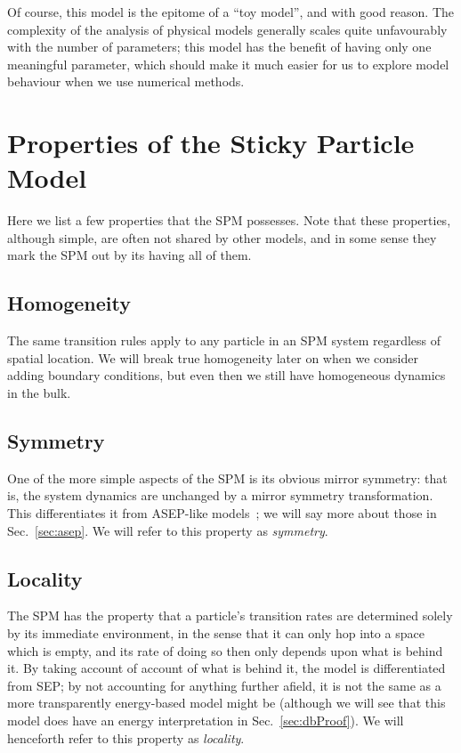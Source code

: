 Of course, this model is the epitome of a ``toy model'', and with good reason. The complexity of the
analysis of physical models generally scales quite unfavourably with the number of parameters; this model
has the benefit of having only one meaningful parameter, which should make it much easier for us
to explore model behaviour when we use numerical methods.

\section{Properties of the Sticky Particle Model} \label{sec:spmProperties}
Here we list a few properties that the SPM possesses. Note that these properties, although simple, are
often not shared by other models, and in some sense they mark the SPM out by its having all of them.
\subsection{Homogeneity}
The same transition rules apply to any particle in an SPM system regardless of spatial location.
We will break true homogeneity later on when we consider adding boundary conditions, but even then
we still have homogeneous dynamics in the bulk.
\subsection{Symmetry}
One of the more simple aspects of the SPM is its obvious mirror symmetry: that is, the system dynamics
are unchanged by a mirror symmetry transformation. This differentiates it from ASEP-like models~\cite{golinelli2006}; we
will say more about those in Sec.~\ref{sec:asep}. We will refer to this property as \textit{symmetry}.
\subsection{Locality}
The SPM has the property that a particle's transition rates are determined solely by its immediate
environment, in the sense that it can only hop into a space which is empty, and its rate of doing so
then only depends upon what is behind it. By taking account of account of what is behind it, the model is differentiated from SEP; by not accounting 
for anything further afield, it is not the
same as a more transparently energy-based model might be (although we will see that this model does
have an energy interpretation in Sec.~\ref{sec:dbProof}). We will henceforth refer to this property
as \textit{locality}.
